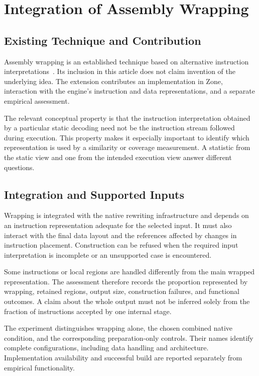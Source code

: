 \section{Integration of Assembly Wrapping}\label{sec:wrapping}
\subsection{Existing Technique and Contribution}
Assembly wrapping is an established technique based on alternative
instruction interpretations~\cite{assembly_wrapping}. Its inclusion in
this article does not claim invention of the underlying idea. The
extension contributes an implementation in Zone, interaction with the
engine's instruction and data representations, and a separate empirical
assessment.

The relevant conceptual property is that the instruction interpretation
obtained by a particular static decoding need not be the instruction
stream followed during execution. This property makes it especially
important to identify which representation is used by a similarity or
coverage measurement. A statistic from the static view and one from
the intended execution view answer different questions.

\subsection{Integration and Supported Inputs}
Wrapping is integrated with the native rewriting infrastructure and
depends on an instruction representation adequate for the selected
input. It must also interact with the final data layout and the
references affected by changes in instruction placement. Construction
can be refused when the required input interpretation is incomplete
or an unsupported case is encountered.

Some instructions or local regions are handled differently from the
main wrapped representation. The assessment therefore records the
proportion represented by wrapping, retained regions, output size,
construction failures, and functional outcomes. A claim about the
whole output must not be inferred solely from the fraction of
instructions accepted by one internal stage.

The experiment distinguishes wrapping alone, the chosen combined
native condition, and the corresponding preparation-only controls.
Their names identify complete configurations, including data handling
and architecture. Implementation availability and successful build
are reported separately from empirical functionality.

